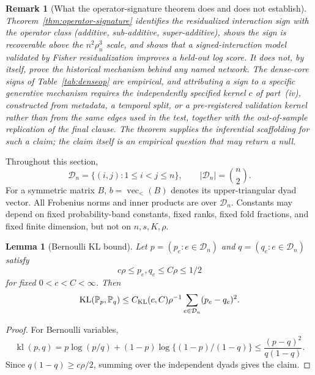 \documentclass[12pt]{article}
\makeatletter
\newtheorem{lemma}{Lemma}
\newtheorem{remark}{Remark}
\def\section{\@startsection{section}{1}{\z@}{-0.16in}{0.04in}{\large\bf\raggedright}}
\newcommand{\1}{\mathbf{1}}
\newcommand{\KL}{\mathrm{KL}}
\providecommand{\vecl}{\operatorname{vec}_{<}}
\providecommand{\Pb}{\mathbb P}
\providecommand{\kl}{\operatorname{kl}}
\makeatother
\begin{document}
\begin{remark}[What the operator-signature theorem does and does not establish]
Theorem~\ref{thm:operator-signature} identifies the residualized interaction sign with the operator class
(additive, sub-additive, super-additive), shows the sign is recoverable above the $n^2\rho_n^3$ scale, and
shows that a signed-interaction model validated by Fisher residualization improves a held-out log score. It
does not, by itself, prove the historical mechanism behind any named network. The dense-core signs of
Table~\ref{tab:denseop} are empirical, and attributing a sign to a specific generative mechanism requires the
independently specified kernel $c$ of part~(iv), constructed from metadata, a temporal split, or a
pre-registered validation kernel rather than from the same edges used in the test, together with the
out-of-sample replication of the final clause. The theorem supplies the inferential scaffolding for such a
claim; the claim itself is an empirical question that may return a null.
\end{remark}


\section{Closing the remaining gaps}
\label{app:gaps}

Throughout this section,
\[
  \mathcal D_n=\{(i,j):1\le i<j\le n\},\qquad |\mathcal D_n|=\binom n2.
\]
For a symmetric matrix \(B\), \(b=\vecl(B)\) denotes its upper-triangular
dyad vector.  All Frobenius norms and inner products are over \(\mathcal D_n\).
Constants may depend on fixed probability-band constants, fixed ranks,
fixed fold fractions, and fixed finite dimension, but not on
\(n,s,K,\rho\).

\begin{lemma}[Bernoulli KL bound]\label{lem:bern-kl-final2}
Let \(p=(p_e:e\in\mathcal D_n)\) and \(q=(q_e:e\in\mathcal D_n)\) satisfy
\[
  c\rho\le p_e,q_e\le C\rho\le 1/2
\]
for fixed \(0<c<C<\infty\).  Then
\[
  \KL(\Pb_p,\Pb_q)
  \le C_{\rm KL}(c,C)\rho^{-1}\sum_{e\in\mathcal D_n}(p_e-q_e)^2 .
\]
\end{lemma}

\begin{proof}
For Bernoulli variables,
\[
  \kl(p,q)
  =
  p\log(p/q)+(1-p)\log\{(1-p)/(1-q)\}
  \le
  \frac{(p-q)^2}{q(1-q)} .
\]
Since \(q(1-q)\ge c\rho/2\), summing over the independent dyads gives
the claim.
\end{proof}
\end{document}
